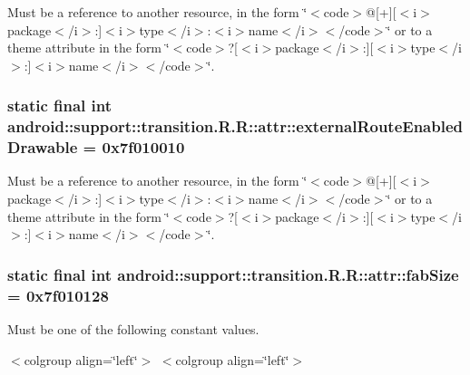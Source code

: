 Must be a reference to another resource, in the form \char`\"{}$<$code$>$@\mbox{[}+\mbox{]}\mbox{[}$<$i$>$package$<$/i$>$:\mbox{]}$<$i$>$type$<$/i$>$:$<$i$>$name$<$/i$>$$<$/code$>$\char`\"{} or to a theme attribute in the form \char`\"{}$<$code$>$?\mbox{[}$<$i$>$package$<$/i$>$:\mbox{]}\mbox{[}$<$i$>$type$<$/i$>$:\mbox{]}$<$i$>$name$<$/i$>$$<$/code$>$\char`\"{}. \hypertarget{classandroid_1_1support_1_1transition_1_1_r_1_1attr_1da151446a73b34510005f54f00f82c9}{
\subsubsection[{externalRouteEnabledDrawable}]{\setlength{\rightskip}{0pt plus 5cm}static final int android::support::transition.R.R::attr::externalRouteEnabledDrawable = 0x7f010010}}
\label{classandroid_1_1support_1_1transition_1_1_r_1_1attr_1da151446a73b34510005f54f00f82c9}


Must be a reference to another resource, in the form \char`\"{}$<$code$>$@\mbox{[}+\mbox{]}\mbox{[}$<$i$>$package$<$/i$>$:\mbox{]}$<$i$>$type$<$/i$>$:$<$i$>$name$<$/i$>$$<$/code$>$\char`\"{} or to a theme attribute in the form \char`\"{}$<$code$>$?\mbox{[}$<$i$>$package$<$/i$>$:\mbox{]}\mbox{[}$<$i$>$type$<$/i$>$:\mbox{]}$<$i$>$name$<$/i$>$$<$/code$>$\char`\"{}. \hypertarget{classandroid_1_1support_1_1transition_1_1_r_1_1attr_9764549661977499bdf6f43f64f5cc6e}{
\subsubsection[{fabSize}]{\setlength{\rightskip}{0pt plus 5cm}static final int android::support::transition.R.R::attr::fabSize = 0x7f010128}}
\label{classandroid_1_1support_1_1transition_1_1_r_1_1attr_9764549661977499bdf6f43f64f5cc6e}


Must be one of the following constant values. \begin{TabularC}{0}
\hline
\end{TabularC}
$<$colgroup align=\char`\"{}left\char`\"{}$>$ $<$colgroup align=\char`\"{}left\char`\"{}$>$ 

